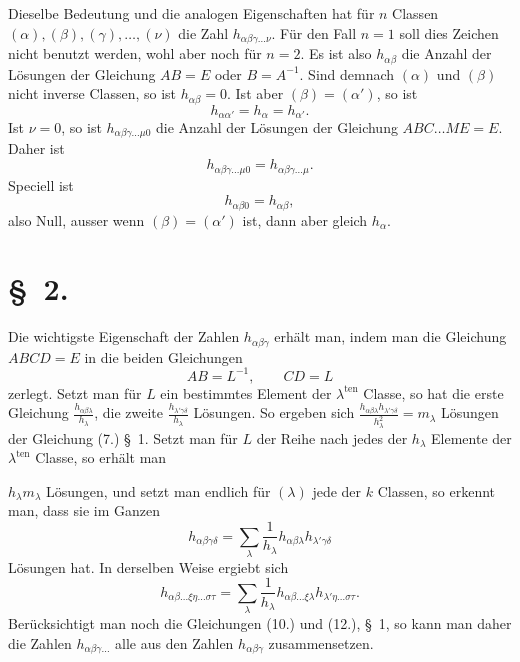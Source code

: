 \documentclass[11pt]{article}
\begin{document}
Dieselbe Bedeutung und die analogen Eigenschaften hat für $n$ Classen $(\alpha),(\beta),(\gamma),\ldots,(\nu)$ die Zahl $h_{\alpha\beta\gamma\ldots\nu}$. Für den Fall $n=1$ soll dies Zeichen nicht benutzt werden, wohl aber noch für $n=2$. Es ist also $h_{\alpha\beta}$ die Anzahl der Lösungen der Gleichung $AB=E$ oder $B=A^{-1}$. Sind demnach $(\alpha)$ und $(\beta)$ nicht inverse Classen, so ist $h_{\alpha\beta}=0$. Ist aber $(\beta)=(\alpha')$, so ist
\begin{equation*}\tag{10.}
h_{\alpha\alpha'}=h_\alpha=h_{\alpha'}.
\end{equation*}
Ist $\nu=0$, so ist $h_{\alpha\beta\gamma\ldots\mu0}$ die Anzahl der Lösungen der Gleichung $ABC\ldots ME=E$. Daher ist
\begin{equation*}\tag{11.}
h_{\alpha\beta\gamma\ldots\mu0}=h_{\alpha\beta\gamma\ldots\mu}.
\end{equation*}
Speciell ist
\begin{equation*}\tag{12.}
h_{\alpha\beta0}=h_{\alpha\beta},
\end{equation*}
also Null, ausser wenn $(\beta)=(\alpha')$ ist, dann aber gleich $h_\alpha$.

\section*{\S~2.}

Die wichtigste Eigenschaft der Zahlen $h_{\alpha\beta\gamma}$ erhält man, indem man die Gleichung $ABCD=E$ in die beiden Gleichungen
\[
AB=L^{-1},\qquad CD=L
\]
zerlegt. Setzt man für $L$ ein bestimmtes Element der $\lambda^{\mathrm{ten}}$ Classe, so hat die erste Gleichung $\frac{h_{\alpha\beta\lambda}}{h_\lambda}$, die zweite $\frac{h_{\lambda'\gamma\delta}}{h_\lambda}$ Lösungen. So ergeben sich $\frac{h_{\alpha\beta\lambda}h_{\lambda'\gamma\delta}}{h_\lambda^2}=m_\lambda$ Lösungen der Gleichung (7.) \S~1. Setzt man für $L$ der Reihe nach jedes der $h_\lambda$ Elemente der $\lambda^{\mathrm{ten}}$ Classe, so erhält man




$h_\lambda m_\lambda$ Lösungen, und setzt man endlich für $(\lambda)$ jede der $k$ Classen, so erkennt man, dass sie im Ganzen
\begin{equation*}\tag{1.}
h_{\alpha\beta\gamma\delta}=\sum_\lambda \frac{1}{h_\lambda}h_{\alpha\beta\lambda}h_{\lambda'\gamma\delta}
\end{equation*}
Lösungen hat. In derselben Weise ergiebt sich
\begin{equation*}\tag{2.}
h_{\alpha\beta\ldots\xi\eta\ldots\sigma\tau}=\sum_\lambda \frac{1}{h_\lambda}h_{\alpha\beta\ldots\xi\lambda}h_{\lambda'\eta\ldots\sigma\tau}.
\end{equation*}
Berücksichtigt man noch die Gleichungen (10.) und (12.), \S~1, so kann man daher die Zahlen $h_{\alpha\beta\gamma\ldots}$ alle aus den Zahlen $h_{\alpha\beta\gamma}$ zusammensetzen.
\end{document}
